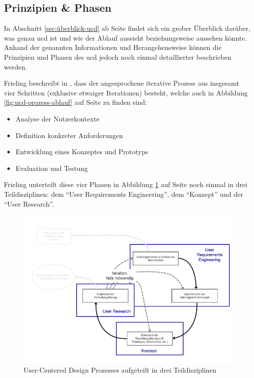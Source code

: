 \documentclass[a4paper,12pt,twoside]{scrreprt}
\begin{document}
\subsection*{Prinzipien \& Phasen}
\label{sub-sec:prinzipien-phasen-ucd}

In Abschnitt \ref{sec:überblick-ucd} ab Seite \pageref{sec:überblick-ucd} findet sich ein grober Überblick darüber, was genau \acl{ucd} ist und wie der Ablauf aussieht beziehungsweise aussehen könnte. Anhand der genannten Informationen und Herangehensweise können die Prinzipien und Phasen des \ac{ucd} jedoch noch einmal detaillierter beschrieben werden.

Frieling beschreibt in \cite{frieling_user_2019}, dass der angesprochene iterative Prozess aus insgesamt vier Schritten (exklusive etwaiger Iterationen) besteht, welche auch in Abbildung \ref{fig:ucd-prozess-ablauf} auf Seite \pageref{fig:ucd-prozess-ablauf} zu finden sind:
\begin{itemize}
    \item Analyse der Nutzerkontexte
    \item Definition konkreter Anforderungen
    \item Entwicklung eines Konzeptes und Prototyps
    \item Evaluation und Testung
\end{itemize}

Frieling unterteilt diese vier Phasen in Abbildung \ref{fig:ucd-prozess-teildisziplinen} auf Seite \pageref{fig:ucd-prozess-teildisziplinen} noch einmal in drei Teildisziplinen: dem \enquote{User Requirements Engineering}, dem \enquote{Konzept} und der \enquote{User Research}.

\begin{figure}[ht!]
    \centering
    \includegraphics[width=.75\linewidth]{thesis/images/Frieling_UCD-Prozess-Teildisziplinen.pdf}
    \caption[User-Centered Design Prozesses aufgeteilt in drei Teildisziplinen]{User-Centered Design Prozesses aufgeteilt in drei Teildisziplinen \cite{frieling_user_2019}}
    \label{fig:ucd-prozess-teildisziplinen}
\end{figure}
\end{document}
